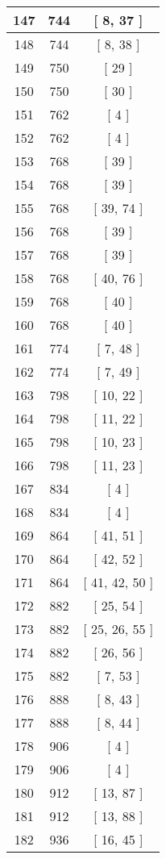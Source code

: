 \begin{center}
\begin{longtable}[H]{|| c c c ||}
\hline
147 & 744 & [ 8, 37 ] \\ 
\hline
148 & 744 & [ 8, 38 ] \\ 
\hline
149 & 750 & [ 29 ] \\ 
\hline
150 & 750 & [ 30 ] \\ 
\hline
151 & 762 & [ 4 ] \\ 
\hline
152 & 762 & [ 4 ] \\ 
\hline
153 & 768 & [ 39 ] \\ 
\hline
154 & 768 & [ 39 ] \\ 
\hline
155 & 768 & [ 39, 74 ] \\ 
\hline
156 & 768 & [ 39 ] \\ 
\hline
157 & 768 & [ 39 ] \\ 
\hline
158 & 768 & [ 40, 76 ] \\ 
\hline
159 & 768 & [ 40 ] \\ 
\hline
160 & 768 & [ 40 ] \\ 
\hline
161 & 774 & [ 7, 48 ] \\ 
\hline
162 & 774 & [ 7, 49 ] \\ 
\hline
163 & 798 & [ 10, 22 ] \\ 
\hline
164 & 798 & [ 11, 22 ] \\ 
\hline
165 & 798 & [ 10, 23 ] \\ 
\hline
166 & 798 & [ 11, 23 ] \\ 
\hline
167 & 834 & [ 4 ] \\ 
\hline
168 & 834 & [ 4 ] \\ 
\hline
169 & 864 & [ 41, 51 ] \\ 
\hline
170 & 864 & [ 42, 52 ] \\ 
\hline
171 & 864 & [ 41, 42, 50 ] \\ 
\hline
172 & 882 & [ 25, 54 ] \\ 
\hline
173 & 882 & [ 25, 26, 55 ] \\ 
\hline
174 & 882 & [ 26, 56 ] \\ 
\hline
175 & 882 & [ 7, 53 ] \\ 
\hline
176 & 888 & [ 8, 43 ] \\ 
\hline
177 & 888 & [ 8, 44 ] \\ 
\hline
178 & 906 & [ 4 ] \\ 
\hline
179 & 906 & [ 4 ] \\ 
\hline
180 & 912 & [ 13, 87 ] \\ 
\hline
181 & 912 & [ 13, 88 ] \\ 
\hline
182 & 936 & [ 16, 45 ] \\ 

\end{longtable}
\end{center}
